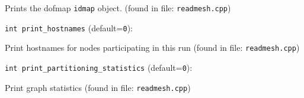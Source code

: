 Prints the dofmap  \verb+idmap+  object. 
 (found in file: \verb+readmesh.cpp+)
\item\verb+int print_hostnames+ {\rm(default=\verb|0|)}:

Print hostnames for nodes participating in this run
 (found in file: \verb+readmesh.cpp+)
\item\verb+int print_partitioning_statistics+ {\rm(default=\verb|0|)}:

Print graph statistics
 (found in file: \verb+readmesh.cpp+)
